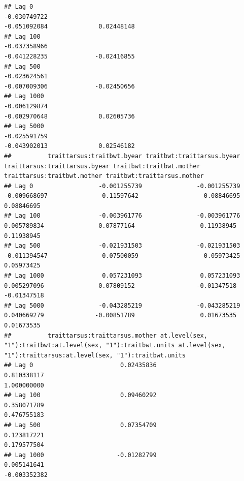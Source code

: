 \documentclass[
  12pt,
]{book}
\begin{document}
\begin{verbatim}
## Lag 0                                                         -0.030749722                                                         -0.051092084              0.02448148
## Lag 100                                                       -0.037358966                                                         -0.041228235             -0.02416855
## Lag 500                                                       -0.023624561                                                         -0.007009306             -0.02450656
## Lag 1000                                                      -0.006129874                                                         -0.002970648              0.02605736
## Lag 5000                                                      -0.025591759                                                         -0.043902013              0.02546182
##          traittarsus:traitbwt.byear traitbwt:traittarsus.byear traittarsus:traittarsus.byear traitbwt:traitbwt.mother traittarsus:traitbwt.mother traitbwt:traittarsus.mother
## Lag 0                  -0.001255739               -0.001255739                  -0.009668697               0.11597642                  0.08846695                  0.08846695
## Lag 100                -0.003961776               -0.003961776                   0.005789834               0.07877164                  0.11938945                  0.11938945
## Lag 500                -0.021931503               -0.021931503                  -0.011394547               0.07500059                  0.05973425                  0.05973425
## Lag 1000                0.057231093                0.057231093                   0.005297096               0.07809152                 -0.01347518                 -0.01347518
## Lag 5000               -0.043285219               -0.043285219                   0.040669279              -0.00851789                  0.01673535                  0.01673535
##          traittarsus:traittarsus.mother at.level(sex, "1"):traitbwt:at.level(sex, "1"):traitbwt.units at.level(sex, "1"):traittarsus:at.level(sex, "1"):traitbwt.units
## Lag 0                        0.02435836                                                   0.810338117                                                      1.000000000
## Lag 100                      0.09460292                                                   0.358071789                                                      0.476755183
## Lag 500                      0.07354709                                                   0.123817221                                                      0.179577504
## Lag 1000                    -0.01282799                                                   0.005141641                                                     -0.003352382

\end{verbatim}
\end{document}
